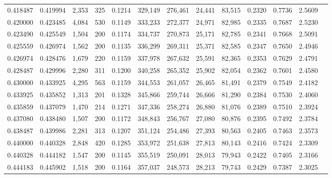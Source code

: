 \begin{tabular}{rrrrrrrrrrrrr}
0.418487 & 0.419994 & 2,353 & 325 &                                     0.1214 & 329,149 & 276,461 &  24,441 &  83,515 & 0.2320 & 0.7736 & 2.5609 \\
0.420000 & 0.423485 & 4,084 & 530 &                                     0.1149 & 333,233 & 272,377 &  24,971 &  82,985 & 0.2335 & 0.7687 & 2.5230 \\
0.423490 & 0.425549 & 1,504 & 200 &                                     0.1174 & 334,737 & 270,873 &  25,171 &  82,785 & 0.2341 & 0.7668 & 2.5091 \\
0.425559 & 0.426974 & 1,562 & 200 &                                     0.1135 & 336,299 & 269,311 &  25,371 &  82,585 & 0.2347 & 0.7650 & 2.4946 \\
0.426974 & 0.428476 & 1,679 & 220 &                                     0.1159 & 337,978 & 267,632 &  25,591 &  82,365 & 0.2353 & 0.7629 & 2.4791 \\
0.428487 & 0.429996 & 2,280 & 311 &                                     0.1200 & 340,258 & 265,352 &  25,902 &  82,054 & 0.2362 & 0.7601 & 2.4580 \\
0.430000 & 0.433925 & 4,295 & 563 &                                     0.1159 & 344,553 & 261,057 &  26,465 &  81,491 & 0.2379 & 0.7549 & 2.4182 \\
0.433925 & 0.435852 & 1,313 & 201 &                                     0.1328 & 345,866 & 259,744 &  26,666 &  81,290 & 0.2384 & 0.7530 & 2.4060 \\
0.435859 & 0.437079 & 1,470 & 214 &                                     0.1271 & 347,336 & 258,274 &  26,880 &  81,076 & 0.2389 & 0.7510 & 2.3924 \\
0.437080 & 0.438480 & 1,507 & 200 &                                     0.1172 & 348,843 & 256,767 &  27,080 &  80,876 & 0.2395 & 0.7492 & 2.3784 \\
0.438487 & 0.439986 & 2,281 & 313 &                                     0.1207 & 351,124 & 254,486 &  27,393 &  80,563 & 0.2405 & 0.7463 & 2.3573 \\
0.440000 & 0.440328 & 2,848 & 420 &                                     0.1285 & 353,972 & 251,638 &  27,813 &  80,143 & 0.2416 & 0.7424 & 2.3309 \\
0.440328 & 0.444182 & 1,547 & 200 &                                     0.1145 & 355,519 & 250,091 &  28,013 &  79,943 & 0.2422 & 0.7405 & 2.3166 \\
0.444183 & 0.445902 & 1,518 & 200 &                                     0.1164 & 357,037 & 248,573 &  28,213 &  79,743 & 0.2429 & 0.7387 & 2.3025 \\

\end{tabular}
